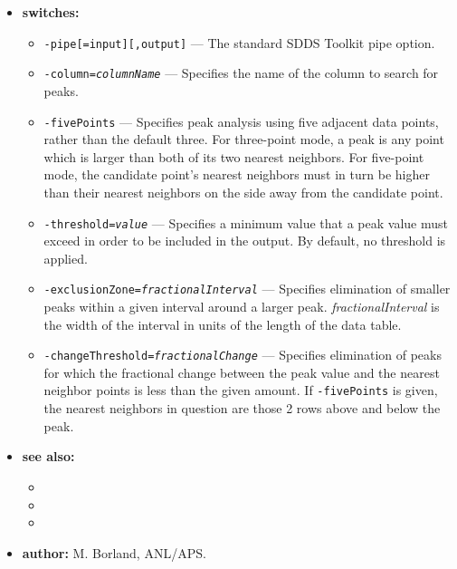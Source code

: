 \begin{itemize}
\item {\bf switches:}
    \begin{itemize}
    \item \verb|-pipe[=input][,output]| --- The standard SDDS Toolkit pipe option.
    \item {\tt -column={\em columnName}} --- Specifies the name of the column to search for peaks. 
    \item {\tt -fivePoints} --- Specifies peak analysis using five adjacent data points, rather than
        the default three.  For three-point mode, a peak is any point which is larger than both of
        its two nearest neighbors.  For five-point mode, the candidate point's nearest neighbors must in turn
        be higher than their nearest neighbors on the side away from the candidate point.
    \item {\tt -threshold={\em value}} --- Specifies a minimum value that a peak value must exceed in order
        to be included in the output.  By default, no threshold is applied.
    \item {\tt -exclusionZone={\em fractionalInterval}} --- Specifies elimination of smaller peaks within a given interval
        around a larger peak.  {\em fractionalInterval} is the width of the interval in units of the length of the data table.
    \item {\tt -changeThreshold={\em fractionalChange}} --- Specifies elimination of peaks for which the fractional
        change between the peak value and the nearest neighbor points is less than the given amount.  If 
        {\tt -fivePoints} is given, the nearest neighbors in question are those 2 rows above and below the
        peak.
    \end{itemize}
\item {\bf see also:}
    \begin{itemize}
    \item {}
    \item {}
    \item {}
    \end{itemize}
\item {\bf author:} M. Borland, ANL/APS.
\end{itemize}

